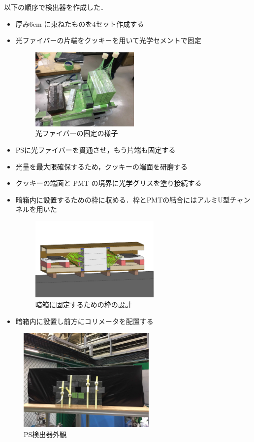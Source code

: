 以下の順序で検出器を作成した．
  \begin{itemize}
    \item 厚み$6\mathrm{cm}$ に束ねたものを$4$セット作成する
    \item 光ファイバーの片端をクッキーを用いて光学セメントで固定
       \begin{figure}[H]
         \centering
         \includegraphics[width=0.5\textwidth]{figure/hayakawa/ps_kotei.jpg}
         \caption{光ファイバーの固定の様子}
       \end{figure}
    \item PSに光ファイバーを貫通させ，もう片端も固定する
    \item 光量を最大限確保するため，クッキーの端面を研磨する
    \item クッキーの端面と PMT の境界に光学グリスを塗り接続する
    \item 暗箱内に設置するための枠に収める．枠とPMTの結合にはアルミU型チャンネルを用いた
       \begin{figure}[H]
         \centering
         \includegraphics[width=0.6\textwidth]{figure/hayakawa/waku1.png}
         \caption{暗箱に固定するための枠の設計}
       \end{figure}
    \item 暗箱内に設置し前方にコリメータを配置する
  \end{itemize}



\begin{figure} [H]
    \centering
    \includegraphics[width=0.6\textwidth]{figure/hayakawa/PS_real.jpg}
    \caption{PS検出器外観}
\end{figure}

